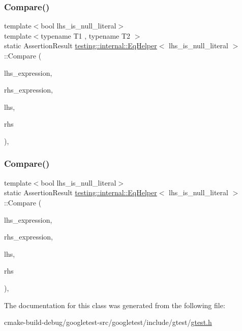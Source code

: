 \subsubsection{\texorpdfstring{Compare()}{Compare()}\hspace{0.1cm}{\footnotesize\ttfamily [1/2]}}
{\footnotesize\ttfamily template$<$bool lhs\+\_\+is\+\_\+null\+\_\+literal$>$ \\
template$<$typename T1 , typename T2 $>$ \\
static Assertion\+Result \mbox{\hyperlink{classtesting_1_1internal_1_1EqHelper}{testing\+::internal\+::\+Eq\+Helper}}$<$ lhs\+\_\+is\+\_\+null\+\_\+literal $>$\+::Compare (\begin{DoxyParamCaption}\item[{const char $\ast$}]{lhs\+\_\+expression,  }\item[{const char $\ast$}]{rhs\+\_\+expression,  }\item[{const T1 \&}]{lhs,  }\item[{const T2 \&}]{rhs }\end{DoxyParamCaption})\hspace{0.3cm}{\ttfamily [inline]}, {\ttfamily [static]}}

\mbox{\label{classtesting_1_1internal_1_1EqHelper_aaa42c0059bb3dcc43d556243febb5f1c}} 
\subsubsection{\texorpdfstring{Compare()}{Compare()}\hspace{0.1cm}{\footnotesize\ttfamily [2/2]}}
{\footnotesize\ttfamily template$<$bool lhs\+\_\+is\+\_\+null\+\_\+literal$>$ \\
static Assertion\+Result \mbox{\hyperlink{classtesting_1_1internal_1_1EqHelper}{testing\+::internal\+::\+Eq\+Helper}}$<$ lhs\+\_\+is\+\_\+null\+\_\+literal $>$\+::Compare (\begin{DoxyParamCaption}\item[{const char $\ast$}]{lhs\+\_\+expression,  }\item[{const char $\ast$}]{rhs\+\_\+expression,  }\item[{\mbox{\hyperlink{namespacetesting_1_1internal_a05c6bd9ede5ccdf25191a590d610dcc6}{Biggest\+Int}}}]{lhs,  }\item[{\mbox{\hyperlink{namespacetesting_1_1internal_a05c6bd9ede5ccdf25191a590d610dcc6}{Biggest\+Int}}}]{rhs }\end{DoxyParamCaption})\hspace{0.3cm}{\ttfamily [inline]}, {\ttfamily [static]}}



The documentation for this class was generated from the following file\+:\begin{DoxyCompactItemize}
\item 
cmake-\/build-\/debug/googletest-\/src/googletest/include/gtest/\mbox{\hyperlink{gtest_8h}{gtest.\+h}}\end{DoxyCompactItemize}
